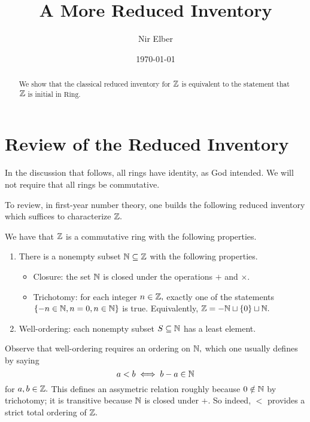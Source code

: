 \documentclass{article}
\title{A More Reduced Inventory}
\author{Nir Elber}
\date{\today}
\begin{document}
\maketitle

\begin{abstract}
	We show that the classical reduced inventory for $\mathbb Z$ is equivalent to the statement that $\mathbb Z$ is initial in $\mathrm{Ring}.$
\end{abstract}

\toctrue
\tableofcontents
\tocfalse

\newpage

\section{Review of the Reduced Inventory}
In the discussion that follows, all rings have identity, as God intended. We will not require that all rings be commutative.

To review, in first-year number theory, one builds the following reduced inventory which suffices to characterize $\mathbb Z.$
\begin{inv} \label{inv:redinvent}
	We have that $\mathbb Z$ is a commutative ring with the following properties.
	\begin{enumerate}
		\item There is a nonempty subset $\mathbb N\subseteq\mathbb Z$ with the following properties.
		\begin{itemize}
			\item Closure: the set $\mathbb N$ is closed under the operations $+$ and $\times.$
			\item Trichotomy: for each integer $n\in\mathbb Z,$ exactly one of the statements $\{-n\in\mathbb N,n=0,n\in\mathbb N\}$ is true. Equivalently, $\mathbb Z=-\mathbb N\sqcup\{0\}\sqcup\mathbb N.$
		\end{itemize}
		\item Well-ordering: each nonempty subset $S\subseteq\mathbb N$ has a least element.
	\end{enumerate}
\end{inv}
Observe that well-ordering requires an ordering on $\mathbb N,$ which one usually defines by saying
\[a<b\iff b-a\in\mathbb N\]
for $a,b\in\mathbb Z.$ This defines an assymetric relation roughly because $0\notin\mathbb N$ by trichotomy; it is transitive because $\mathbb N$ is closed under $+.$ So indeed, $<$ provides a strict total ordering of $\mathbb Z.$
\end{document}
